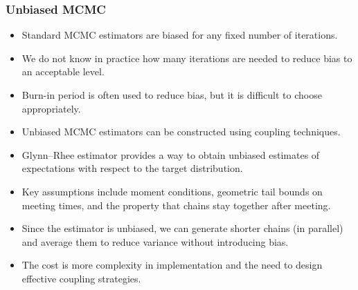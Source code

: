 \documentclass[aspectratio=169]{beamer}
\begin{document}
\begin{frame}
\frametitle{Unbiased MCMC}

\begin{itemize}
  \item Standard MCMC estimators are biased for any fixed number of iterations.
  \item We do not know in practice how many iterations are needed to reduce bias to an acceptable level.
  \item Burn-in period is often used to reduce bias, but it is difficult to choose appropriately.
  \item Unbiased MCMC estimators can be constructed using coupling techniques.
  \item Glynn--Rhee estimator provides a way to obtain unbiased estimates of expectations with respect to the target distribution.
  \item Key assumptions include moment conditions, geometric tail bounds on meeting times, and the property that chains stay together after meeting.
  \item Since the estimator is unbiased, we can generate shorter chains (in parallel) and average them to reduce variance without introducing bias.
  \item The cost is more complexity in implementation and the need to design effective coupling strategies.
\end{itemize}
\end{frame}
\end{document}
